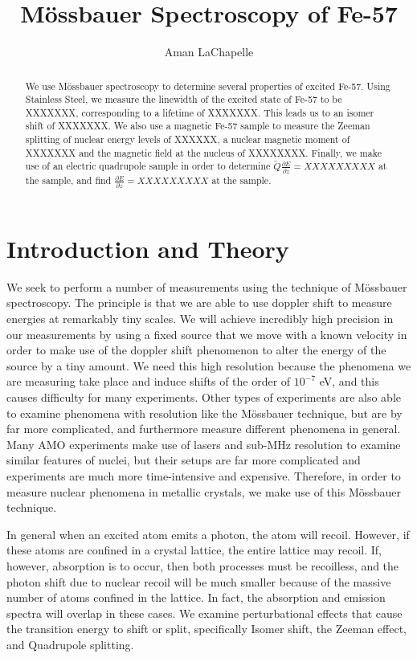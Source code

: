 \documentclass[reprint, nobibnotes, amssymb, amsmath, amsfonts, mathtools, mathrsfs, floatfix]{revtex4-1}
\newcommand{\moss}{M\"{o}ssbauer }
\begin{document}
  \title{\moss Spectroscopy of Fe-57}

  \author{Aman LaChapelle}

  \begin{abstract}
    We use \moss spectroscopy to determine several properties of excited Fe-57.  Using Stainless Steel, we measure the linewidth of the excited state of Fe-57 to be XXXXXXX, corresponding to a lifetime of XXXXXXX.  This leads us to an isomer shift of XXXXXXX.  We also use a magnetic Fe-57 sample to measure the Zeeman splitting of nuclear energy levels of XXXXXX, a nuclear magnetic moment of XXXXXXX and the magnetic field at the nucleus of XXXXXXXX.  Finally, we make use of an electric quadrupole sample in order to determine $\tilde{Q}\frac{\partial E}{\partial z} = XXXXXXXXX$ at the sample, and find $\frac{\partial E}{\partial z} = XXXXXXXXX$ at the sample.
  \end{abstract}

  \maketitle
  \tableofcontents

  \section{Introduction and Theory}
    We seek to perform a number of measurements using the technique of \moss spectroscopy.  The principle is that we are able to use doppler shift to measure energies at remarkably tiny scales.  We will achieve incredibly high precision in our measurements by using a fixed source that we move with a known velocity in order to make use of the doppler shift phenomenon to alter the energy of the source by a tiny amount.  We need this high resolution because the phenomena we are measuring take place and induce shifts of the order of $10^{-7}$ eV, and this causes difficulty for many experiments.  Other types of experiments are also able to examine phenomena with resolution like the \moss technique, but are by far more complicated, and furthermore measure different phenomena in general.  Many AMO experiments make use of lasers and sub-MHz resolution to examine similar features of nuclei, but their setups are far more complicated and experiments are much more time-intensive and expensive.  Therefore, in order to measure nuclear phenomena in metallic crystals, we make use of this \moss technique.

    In general when an excited atom emits a photon, the atom will recoil.  However, if these atoms are confined in a crystal lattice, the entire lattice may recoil.  If, however, absorption is to occur, then both processes must be recoilless, and the photon shift due to nuclear recoil will be much smaller because of the massive number of atoms confined in the lattice.  In fact, the absorption and emission spectra will overlap in these cases.  We examine perturbational effects that cause the transition energy to shift or split, specifically Isomer shift, the Zeeman effect, and Quadrupole splitting.
\end{document}
